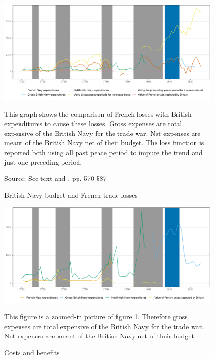 \documentclass[12pt,a4paper,notitlepage,english]{article}
\newcommand{\fontsmall}{\fontsize{10pt}{12pt}\selectfont}
\newcommand{\source}[1]{\caption*{\footnotesize Source: {#1}} }
\begin{document}
\begin{appendix}
\begin{figure}[h!]
\caption{British Navy budget and French trade losses}
\label{Expenditures}
\centering
\includegraphics[scale=0.6]{Expenditures_Annual_Loss}
\begin{minipage}{18cm}
\begin{flushleft}
\fontsmall
This graph shows the comparison of French losses with British expenditures to cause these losses. Gross expenses are total expensive of the British Navy for the trade war. Net expenses are meant of the British Navy net of their budget. 
The loss function is reported both using all past peace period to impute the trend and just one preceding period. 
\end{flushleft}
\end{minipage}
\source{See text and \cite{mitchell1988}, pp. 570-587}
\end{figure}

\begin{figure}[h!]
\caption{Costs and benefits}
\label{Costs_and_benefits}
\centering
\includegraphics[scale=0.18]{Costs_and_benefits}
\begin{minipage}{18cm}
\begin{flushleft}
\fontsmall 
This figure is a zoomed-in picture of figure \ref{Expenditures}. Therefore gross expenses are total expensive of the British Navy for the trade war. Net expenses are meant of the British Navy net of their budget. 
\end{flushleft}
\end{minipage}
\end{figure}


\end{appendix}
\end{document}

